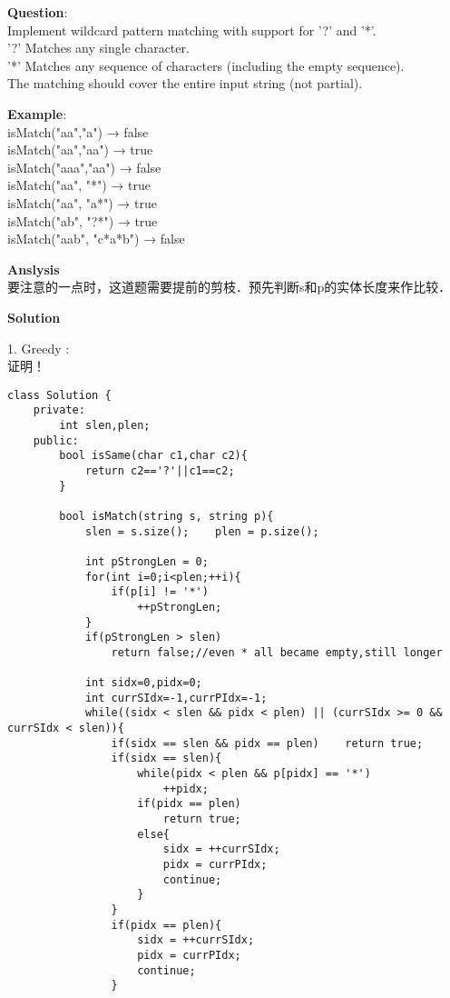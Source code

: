 \begin{description}
    \item{\textbf{Question}}:\\%
		Implement wildcard pattern matching with support for '?' and '*'.\\
		'?' Matches any single character.\\
		'*' Matches any sequence of characters (including the empty sequence).\\
		The matching should cover the entire input string (not partial).\\

    \item{\textbf{Example}}:\\
		isMatch("aa","a") → false\\
		isMatch("aa","aa") → true\\
		isMatch("aaa","aa") → false\\
		isMatch("aa", "*") → true\\
		isMatch("aa", "a*") → true\\
		isMatch("ab", "?*") → true\\
		isMatch("aab", "c*a*b") → false\\

    \item{\textbf{Anslysis}}\\
		要注意的一点时，这道题需要提前的剪枝．预先判断s和p的实体长度来作比较．

    \item{\textbf{Solution}}\\
	\item{1. Greedy} : \\
		证明！
		\begin{lstlisting}
class Solution {
	private:
		int slen,plen;
	public:
		bool isSame(char c1,char c2){
			return c2=='?'||c1==c2;
		}
		
		bool isMatch(string s, string p){
			slen = s.size();	plen = p.size();
			
			int pStrongLen = 0;
			for(int i=0;i<plen;++i){
				if(p[i] != '*')
					++pStrongLen;
			}
			if(pStrongLen > slen) 
				return false;//even * all became empty,still longer

			int sidx=0,pidx=0;
			int currSIdx=-1,currPIdx=-1;
			while((sidx < slen && pidx < plen) || (currSIdx >= 0 && currSIdx < slen)){
				if(sidx == slen && pidx == plen)	return true;
				if(sidx == slen){
					while(pidx < plen && p[pidx] == '*')
						++pidx;
					if(pidx == plen)	
						return true;
					else{
						sidx = ++currSIdx;
						pidx = currPIdx;
						continue;
					}
				}
				if(pidx == plen){
					sidx = ++currSIdx;
					pidx = currPIdx;
					continue;
				}


\end{lstlisting}
\end{description}
